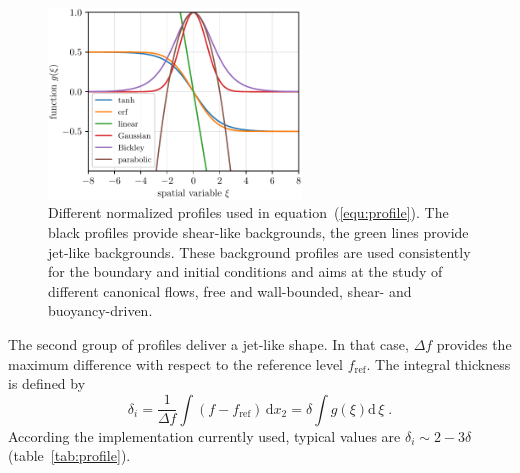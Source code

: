 \begin{figure}
    \includegraphics[clip,width=0.6\textwidth]{figs/profiles1}
    \caption{Different normalized profiles used in equation~(\ref{equ:profile}). The black profiles provide shear-like backgrounds, the green lines provide jet-like backgrounds. These background profiles are used consistently for the boundary and initial conditions and aims at the study of different canonical flows, free and wall-bounded, shear- and buoyancy-driven.}\label{fig:profile}
\end{figure}

The second group of profiles deliver a jet-like shape. In that case, $\Delta f$ provides the maximum difference with respect to the reference level $f_\text{ref}$. The integral thickness is defined by
\begin{equation}
    \delta_i =\frac{1}{\Delta f}\int\! (f-f_\text{ref})\,\mathrm{d} x_2
    = \delta\int\! g(\xi)\mathrm{d}\,\xi \;.
    \label{equ:deltai}
\end{equation}
According the implementation currently used, typical values are $\delta_i\sim 2-3\delta$ (table~\ref{tab:profile}).


